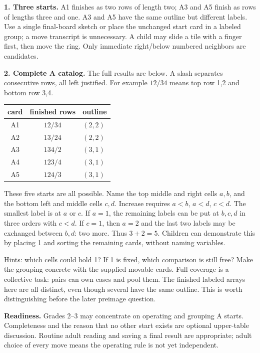 \documentclass[11pt]{article}
\begin{document}
\textbf{1. Three starts.} A1 finishes as two rows of length two; A3 and A5 finish as rows of lengths three and one. A3 and A5 have the same outline but different labels. Use a single final-board sketch or place the unchanged start card in a labeled group; a move transcript is unnecessary. A child may slide a tile with a finger first, then move the ring. Only immediate right/below numbered neighbors are candidates.

\textbf{2. Complete A catalog.} The full results are below. A slash separates consecutive rows, all left justified. For example $12/34$ means top row 1,2 and bottom row 3,4.
\begin{center}\begin{tabular}{ccl}\toprule
card&finished rows&outline\\\midrule
A1&$12/34$&$(2,2)$\\
A2&$13/24$&$(2,2)$\\
A3&$134/2$&$(3,1)$\\
A4&$123/4$&$(3,1)$\\
A5&$124/3$&$(3,1)$\\\bottomrule
\end{tabular}\end{center}
These five starts are all possible. Name the top middle and right cells $a,b$, and the bottom left and middle cells $c,d$. Increase requires $a<b$, $a<d$, $c<d$. The smallest label is at $a$ or $c$. If $a=1$, the remaining labels can be put at $b,c,d$ in three orders with $c<d$. If $c=1$, then $a=2$ and the last two labels may be exchanged between $b,d$: two more. Thus $3+2=5$. Children can demonstrate this by placing 1 and sorting the remaining cards, without naming variables.

Hints: which cells could hold 1? If 1 is fixed, which comparison is still free? Make the grouping concrete with the supplied movable cards. Full coverage is a collective task: pairs can own cases and pool them. The finished labeled arrays here are all distinct, even though several have the same outline. This is worth distinguishing before the later preimage question.

\textbf{Readiness.} Grades 2--3 may concentrate on operating and grouping A starts. Completeness and the reason that no other start exists are optional upper-table discussion. Routine adult reading and saving a final result are appropriate; adult choice of every move means the operating rule is not yet independent.
\end{document}
